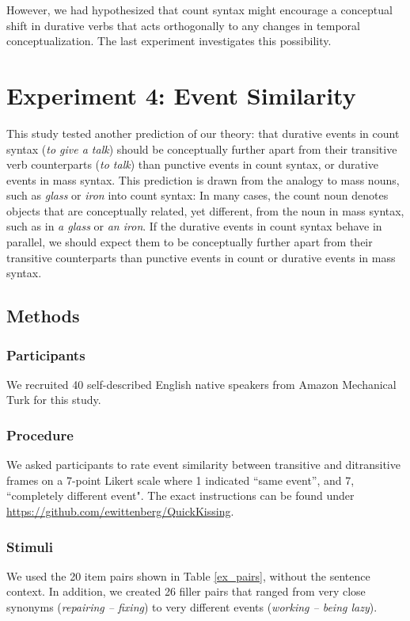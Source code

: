 \documentclass[preprint,12pt,authoryear]{elsarticle}
\begin{document}
However, we had hypothesized that count syntax might encourage a conceptual shift in durative verbs that acts orthogonally to any changes in temporal conceptualization. The last experiment investigates this possibility.

\section{Experiment 4: Event Similarity}\label{sec_expES}
This study tested another prediction of our theory: that durative events in count syntax (\emph{to give a talk}) should be conceptually further apart from their transitive verb counterparts (\emph{to talk}) than punctive events in count syntax, or durative events in mass syntax. This prediction is drawn from the analogy to mass nouns, such as \emph{glass} or \emph{iron} into count syntax: In many cases, the count noun denotes objects that are conceptually related, yet different, from the noun in mass syntax, such as in \emph{a glass} or \emph{an iron}. If the durative events in count syntax behave in parallel, we should expect them to be conceptually further apart from their transitive counterparts than punctive events in count or durative events in mass syntax.

\subsection{Methods}\label{sec_methodES}
\subsubsection{Participants}
We recruited 40 self-described English native speakers from Amazon Mechanical Turk for this study.

\subsubsection{Procedure}\label{sec_procES}
We asked participants to rate event similarity between transitive and ditransitive frames on a 7-point Likert scale where 1 indicated ``same event”, and  7, ``completely different event". The exact instructions can be found under \url{https://github.com/ewittenberg/QuickKissing}.

\subsubsection{Stimuli}\label{sec_stimES}
We used the 20 item pairs shown in Table \ref{ex_pairs}, without the sentence context. In addition, we created 26 filler pairs that ranged from very close synonyms (\emph{repairing -- fixing}) to very different events (\emph{working -- being lazy}).
\end{document}

